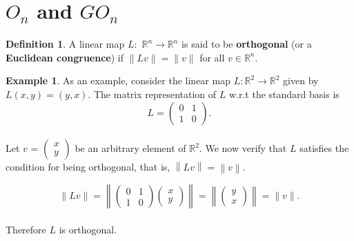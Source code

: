 \documentclass[11pt]{report}
\theoremstyle{plain}
\theoremstyle{definition}
\newtheorem{defn}{Definition}
\newtheorem{exmp}{Example} %
\begin{document}
\section{$ O_n $ and $ GO_n $}
\begin{defn}
	A linear map $ L: $ $ \mathbb{R}^n  \rightarrow  \mathbb{R}^n$ is said to be  \textbf{orthogonal }(or a \textbf{Euclidean congruence}) if  $ \|Lv\| = \|v\| $ for all $ v \in \mathbb{R}^n. $
\end{defn}
	\begin{exmp}
	As an example, consider the linear map $ L : \mathbb{R}^2 \to \mathbb{R}^2 $ given by $ L(x,y)=(y,x) $. The matrix representation of $ L $ w.r.t the standard basis is 
	$$ L = \begin{pmatrix}
	0 & 1\\
	1 & 0
	\end{pmatrix}. $$\\
	Let $ v $ = $ \begin{pmatrix}
	x \\
	y 
	\end{pmatrix} $ be an arbitrary element of $ \mathbb{R}^2 $. We now verify that $ L $ satisfies the condition for being orthogonal, that is, $ \left\|Lv\right\| = \left\| v\right\|.  $
	\\
	\vspace{2mm}
	
	$$ \|Lv\| = \left\| \begin{pmatrix}
	0 & 1\\
	1 & 0
	\end{pmatrix}\begin{pmatrix}
	x \\
	y 
	\end{pmatrix}\right\|  = \left\| \begin{pmatrix}
	y \\
	x 
	\end{pmatrix}\right\|  = \|v\|.$$\vspace{2mm} \\ 
	
	Therefore $  L $ is orthogonal.
	
	\end{exmp}
	
\end{document}
